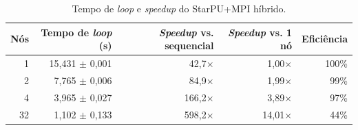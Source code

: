 \begin{table}[h]
\centering
\caption{Tempo de \textit{loop} e \textit{speedup} do StarPU+MPI híbrido.}
\label{tab:starpu-escala}
\begin{tabular}{rrrrr}
\hline
Nós & Tempo de \textit{loop} (s) & \textit{Speedup} vs. sequencial & \textit{Speedup} vs. 1 nó & Eficiência \\
\hline
1 & 15,431 $\pm$ 0,001 & 42,7$\times$ & 1,00$\times$ & 100\% \\
2 & 7,765 $\pm$ 0,006 & 84,9$\times$ & 1,99$\times$ & 99\% \\
4 & 3,965 $\pm$ 0,027 & 166,2$\times$ & 3,89$\times$ & 97\% \\
32 & 1,102 $\pm$ 0,133 & 598,2$\times$ & 14,01$\times$ & 44\% \\
\hline
\end{tabular}
\end{table}
